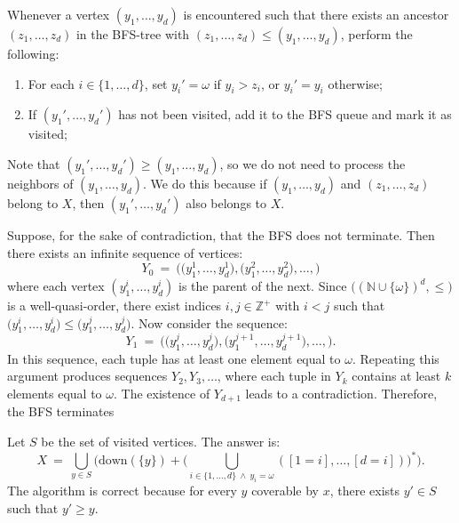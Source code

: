 \documentclass[12pt]{article}
\begin{document}
	\medskip
	
	Whenever a vertex \((y_{1}, \ldots, y_{d})\) is encountered such that there
	exists an ancestor \((z_{1}, \ldots, z_{d})\) in the BFS-tree with \((z_{1},
	\ldots, z_{d}) \leqslant (y_{1}, \ldots, y_{d})\), perform the following:
	\begin{enumerate}
		\item For each \(i \in \{1, \ldots, d\}\), set \(y_{i}' = \omega\) if
		\(y_{i} > z_{i}\), or \(y_{i}' = y_{i}\) otherwise;
		\item If \((y_{1}', \ldots, y_{d}')\) has not been visited, add it to
		      the BFS queue and mark it as visited;
	\end{enumerate}
	Note that \((y_{1}', \ldots, y_{d}') \geqslant (y_{1}, \ldots, y_{d})\), so
	we do not need to process the neighbors of \((y_{1}, \ldots, y_{d})\). We do
	this because if \((y_{1}, \ldots, y_{d})\) and \((z_{1}, \ldots, z_{d})\)
	belong to \(X\), then \((y_{1}', \ldots, y_{d}')\) also belongs to \(X\).
	
	\medskip
	
	Suppose, for the sake of contradiction, that the BFS does not terminate.
	Then there exists an infinite sequence of vertices:
	\[ Y_{0} \ = \ \big( \big( y_{1}^{1}, \ldots, y_{d}^{1} \big), \big(
	y_{1}^{2}, \ldots, y_{d}^{2} \big), \ldots, \big) \]
	where each vertex \((y_{1}^{i}, \ldots, y_{d}^{i})\) is the parent of the
	next. Since \(\big( (\mathbb{N} \cup \{\omega\})^{d}, \leqslant \big)\) is a
	well-quasi-order, there exist indices \(i, j \in \mathbb{Z}^{+}\) with \(i <
	j\) such that \(\big( y_{1}^{i}, \ldots, y_{d}^{i} \big) \leqslant \big(
	y_{1}^{j}, \ldots, y_{d}^{j} \big)\). Now consider the sequence:
	\[ Y_{1} \ = \ \big( \big( y_{1}^{j}, \ldots, y_{d}^{j} \big), \big(
	y_{1}^{j + 1}, \ldots, y_{d}^{j + 1} \big), \ldots, \big) \text{.} \]
	In this sequence, each tuple has at least one element equal to \(\omega\).
	Repeating this argument produces sequences \(Y_{2}, Y_{3}, \ldots\), where
	each tuple in \(Y_{k}\) contains at least \(k\) elements equal to
	\(\omega\). The existence of \(Y_{d + 1}\) leads to a contradiction.
	Therefore, the BFS terminates
	
	\medskip
	
	Let \(S\) be the set of visited vertices. The answer is:
	\[ X \ = \ \bigcup_{y \in S} \Bigg( \text{down}(\{y\}) + \Bigg( \bigcup_{i
	\in \{1, \ldots, d\} \ \wedge \ y_{i} = \omega} ([1 = i], \ldots, [d = i])
	\Bigg)^{\ast} \Bigg) \text{.} \]
	The algorithm is correct because for every \(y\) coverable by \(x\), there
	exists \(y' \in S\) such that \(y' \geqslant y\).
	
\end{document}
